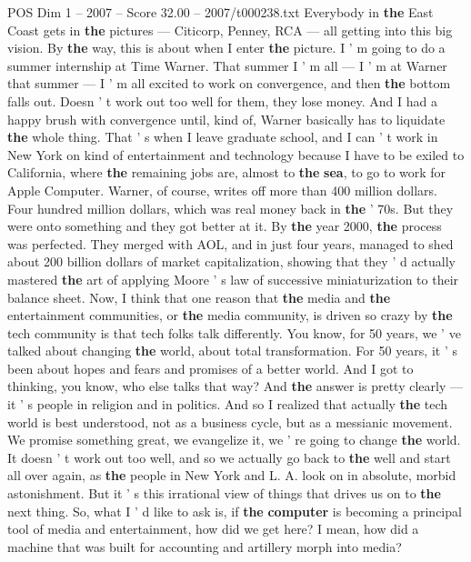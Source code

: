 \begin{textsample}{POS Dim 1 – 2007 – Score 32.00 – 2007/t000238.txt}
Everybody in \textbf{the} East Coast gets in \textbf{the} pictures — Citicorp, Penney, RCA — all getting into this big vision.
By \textbf{the} way, this is about when I enter \textbf{the} picture.
I ' m going to do a summer internship at Time Warner.
That summer I ' m all — I ' m at Warner that summer — I ' m all excited to work on convergence, and then \textbf{the} bottom falls out.
Doesn ' t work out too well for them, they lose money.
And I had a happy brush with convergence until, kind of, Warner basically has to liquidate \textbf{the} whole thing.
That ' s when I leave graduate school, and I can ' t work in New York on kind of entertainment and technology because I have to be exiled to California, where \textbf{the} remaining jobs are, almost to \textbf{the} \textbf{sea}, to go to work for Apple Computer.
Warner, of course, writes off more than 400 million dollars.
Four hundred million dollars, which was real money back in \textbf{the} ' 70s.
But they were onto something and they got better at it.
By \textbf{the} year 2000, \textbf{the} process was perfected.
They merged with AOL, and in just four years, managed to shed about 200 billion dollars of market capitalization, showing that they ' d actually mastered \textbf{the} art of applying Moore ' s law of successive miniaturization to their balance sheet.
Now, I think that one reason that \textbf{the} media and \textbf{the} entertainment communities, or \textbf{the} media community, is driven so crazy by \textbf{the} tech community is that tech folks talk differently.
You know, for 50 years, we ' ve talked about changing \textbf{the} world, about total transformation.
For 50 years, it ' s been about hopes and fears and promises of a better world.
And I got to thinking, you know, who else talks that way?
And \textbf{the} answer is pretty clearly — it ' s people in religion and in politics.
And so I realized that actually \textbf{the} tech world is best understood, not as a business cycle, but as a messianic movement.
We promise something great, we evangelize it, we ' re going to change \textbf{the} world.
It doesn ' t work out too well, and so we actually go back to \textbf{the} well and start all over again, as \textbf{the} people in New York and L.
A. look on in absolute, morbid astonishment.
But it ' s this irrational view of things that drives us on to \textbf{the} next thing.
So, what I ' d like to ask is, if \textbf{the} \textbf{computer} is becoming a principal tool of media and entertainment, how did we get here?
I mean, how did a machine that was built for accounting and artillery morph into media?

\end{textsample}
